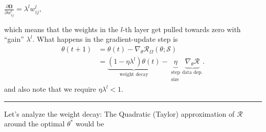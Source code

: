 \documentclass[a2paper,8pt]{extarticle}
\newcommand{\cR}{\mathcal{R}}
\newcommand{\cS}{\mathcal{S}}
\newcommand{\mat}[1]{\mathbf{#1}}
\newcommand{\MOmega}{\mat{\Omega}}
\newcommand{\sep}{\vspace{0pt}\noindent\hrule\vspace{0pt}}
\newcommand{\sep}{\vspace{5pt}\noindent\hrule\vspace{5pt}}
\begin{document}
\begin{landscape}
\begin{multicols*}{7}
$
\frac{\partial \MOmega}{\partial w_{ij}^l}
=
\lambda^lw_{ij}^l,
$

which means that the weights in the $l$-th layer get pulled towards zero with
``gain'' $\lambda^l$. What happens in the gradient-update step is
\begin{align*}
\theta(t+1)
&=\theta(t)-\nabla_{\theta}\cR_{\Omega}(\theta;\cS)
\\
&=
\underbrace{(1-\eta\lambda^l)\theta(t)}_{\text{weight decay}}
-\underbrace{\eta}_{\substack{\text{step}\\\text{size}}}
\underbrace{\nabla_\theta\cR}_{\text{data dep.}}.
\end{align*}
and also note that we require $\eta\lambda^l<1$.

\sep

Let's analyze the weight decay: The Quadratic (Taylor) approximation of $\cR$
around the optimal $\theta^*$ would be


\end{multicols*}
\end{landscape}
\end{document}
